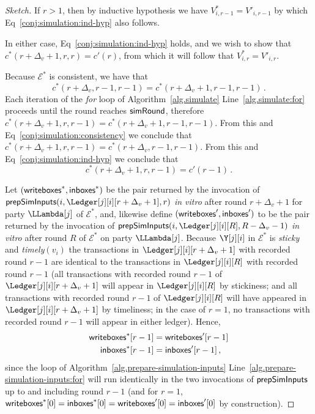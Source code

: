 \begin{proof}[Sketch]
  If $r > 1$, then by inductive hypothesis we have $V^*_{i,r - 1} = V'_{i,r - 1}$
  by which Eq~\ref{conj:simulation:ind-hyp} also follows.

  In either case, Eq~\ref{conj:simulation:ind-hyp} holds, and we
  wish to show that $c^*(r + \Delta_v + 1, r, r) = c'(r)$,
  from which it will follow that $V^*_{i,r} = V'_{i,r}$.

  Because $\mathcal{E}^*$ is consistent, we have that
  \begin{equation}\label{conj:simulation:consistency}
    c^*(r + \Delta_v, r - 1, r - 1) = c^*(r + \Delta_v + 1, r - 1, r - 1)\,.
  \end{equation}
  Each iteration of the \emph{for} loop of Algorithm~\ref{alg.simulate} Line~\ref{alg.simulate:for}
  proceeds until the round reaches $\textsf{simRound}$, therefore
  $c^*(r + \Delta_v + 1, r, r - 1) = c^*(r + \Delta_v + 1, r - 1, r - 1)$.
  From this and Eq~\ref{conj:simulation:consistency} we conclude that
  $c^*(r + \Delta_v + 1, r, r - 1) = c^*(r + \Delta_v, r - 1, r - 1)$.
  From this and Eq~\ref{conj:simulation:ind-hyp} we conclude that
  \begin{equation}\label{conj:simulation:pre-state}
    c^*(r + \Delta_v + 1, r, r - 1) = c'(r - 1)\,.
  \end{equation}

  Let $(\textsf{writeboxes}^*, \textsf{inboxes}^*)$
  be the pair
  returned by the invocation of $\prepareSimulationInputs(i, \Ledger[j][i][r + \Delta_v + 1], r)$
  \emph{in vitro} after round $r + \Delta_v + 1$ for party $\LLambda[j]$ of $\mathcal{E}^*$, and, likewise define
  $(\textsf{writeboxes}', \textsf{inboxes}')$ to be the pair
  returned by the invocation of $\prepareSimulationInputs(i, \Ledger[j][i][R], R - \Delta_v - 1)$
  \emph{in vitro} after round $R$ of $\mathcal{E}^*$ on party $\LLambda[j]$.
  Because $\Y[j][i]$ in $\mathcal{E}^*$ is \emph{sticky} and \emph{timely}$(v_i)$
  the transactions in
  $\Ledger[j][i][r + \Delta_v + 1]$ with recorded round $r - 1$ are identical to
  the transactions in $\Ledger[j][i][R]$ with recorded round $r - 1$
  (all transactions with recorded round $r - 1$ of $\Ledger[j][i][r + \Delta_v + 1]$
   will appear in $\Ledger[j][i][R]$ by stickiness;
   and all transactions with recorded round $r - 1$ of $\Ledger[j][i][R]$ will
   have appeared in $\Ledger[j][i][r + \Delta_v + 1]$ by timeliness; in the case of
   $r = 1$, no transactions with recorded round $r - 1$ will appear in either
   ledger).
  Hence,
  \begin{align}
    \textsf{writeboxes}^*[r - 1] &= \textsf{writeboxes}'[r - 1]\label{conj:simulation:eq-inputs-writes}\\
    \textsf{inboxes}^*[r - 1] &= \textsf{inboxes}'[r - 1]\label{conj:simulation:eq-inputs-inboxes}\,,
  \end{align}
  since the loop of Algorithm~\ref{alg.prepare-simulation-inputs} Line~\ref{alg.prepare-simulation-inputs:for}
  will run identically in the two invocations of $\textsf{prepSimInputs}$ up to
  and including round $r - 1$ (and for
  $r = 1$, $\textsf{writeboxes}^*[0] = \textsf{inboxes}^*[0] = \textsf{writeboxes}'[0] = \textsf{inboxes}'[0]$ by construction).


\end{proof}
